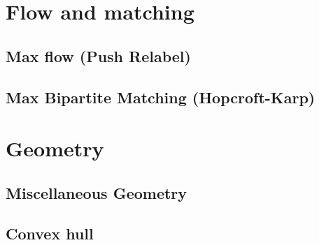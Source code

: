 \documentclass[12pt]{extarticle}
\begin{document}
\begin{multicols*}{2}
\setlength{\parskip}{0.0in}
\setlength{\parskip}{0.0in}
\section{Flow and matching}

\subsection{Max flow (Push Relabel)} %


% 

\subsection{Max Bipartite Matching (Hopcroft-Karp)} %



\section{Geometry}

\subsection{Miscellaneous Geometry} %



\subsection{Convex hull} %


% 


\end{multicols*}
\end{document}
